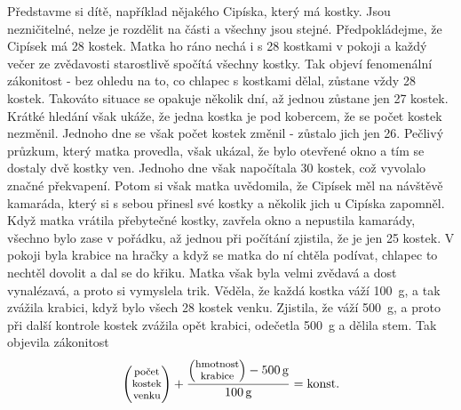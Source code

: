 {    Představme si dítě, například nějakého Cipíska, který má kostky. Jsou nezničitelné, nelze je 
    rozdělit na části a všechny jsou stejné. Předpokládejme, že Cipísek má \num{28} kostek. Matka 
    ho ráno nechá i s \num{28} kostkami v pokoji a každý večer ze zvědavosti starostlivě spočítá 
    všechny kostky. Tak objeví fenomenální zákonitost - bez ohledu na to, co chlapec s kostkami 
    dělal, zůstane vždy \num{28} kostek. Takováto situace se opakuje několik dní, až jednou zůstane 
    jen \num{27} kostek. Krátké hledání však ukáže, že jedna kostka je pod kobercem, že se počet 
    kostek nezměnil. Jednoho dne se však počet kostek změnil - zůstalo jich jen \num{26}. Pečlivý 
    průzkum, který matka provedla, však ukázal, že bylo otevřené okno a tím se dostaly dvě kostky 
    ven. Jednoho dne však napočítala \num{30} kostek, což vyvolalo značné překvapení. Potom si však 
    matka uvědomila, že Cipísek měl na návštěvě kamaráda, který si s sebou přinesl své kostky a 
    několik jich u Cipíska zapomněl. Když matka vrátila přebytečné kostky, zavřela okno a nepustila 
    kamarády, všechno bylo zase v pořádku, až jednou při počítání zjistila, že je jen \num{25} 
    kostek. V pokoji byla krabice na hračky a když se matka do ní chtěla podívat, chlapec to 
    nechtěl dovolit a dal se do křiku. Matka však byla velmi zvědavá a dost vynalézavá, a proto si 
    vymyslela trik. Věděla, že každá kostka váží \SI{100}{\gram}, a tak zvážila krabici, když bylo 
    všech \num{28} kostek venku. Zjistila, že váží \SI{500}{\gram}, a proto při další kontrole 
    kostek zvážila opět krabici, odečetla \SI{500}{\gram} a dělila stem. Tak objevila zákonitost
    \begin{equation*}
      \renewcommand{\arraystretch}{0.8}
        \begin{pmatrix} 
          \text{\footnotesize{počet}}   \\
          \text{\footnotesize{kostek}}  \\
          \text{\footnotesize{venku}}
        \end{pmatrix}   +
      \frac{
        \begin{pmatrix}
          \text{\footnotesize{hmotnost}}  \\
          \text{\footnotesize{krabice}}
        \end{pmatrix}
        - \SI{500}{\gram}}{ \SI{100}{\gram}} = 
      \text{konst.}
    \end{equation*}
    
}
